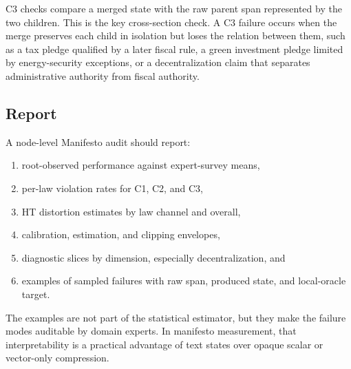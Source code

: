 C3 checks compare a merged state with the raw parent span represented by the
two children. This is the key cross-section check. A C3 failure occurs when
the merge preserves each child in isolation but loses the relation between
them, such as a tax pledge qualified by a later fiscal rule, a green investment
pledge limited by energy-security exceptions, or a decentralization claim that
separates administrative authority from fiscal authority.

\subsection{Report}

A node-level Manifesto audit should report:
\begin{enumerate}[leftmargin=1.5em]
  \item root-observed performance against expert-survey means,
  \item per-law violation rates for C1, C2, and C3,
  \item HT distortion estimates by law channel and overall,
  \item calibration, estimation, and clipping envelopes,
  \item diagnostic slices by dimension, especially decentralization, and
  \item examples of sampled failures with raw span, produced state, and
        local-oracle target.
\end{enumerate}
The examples are not part of the statistical estimator, but they make the
failure modes auditable by domain experts. In manifesto measurement, that
interpretability is a practical advantage of text states over opaque scalar
or vector-only compression.
